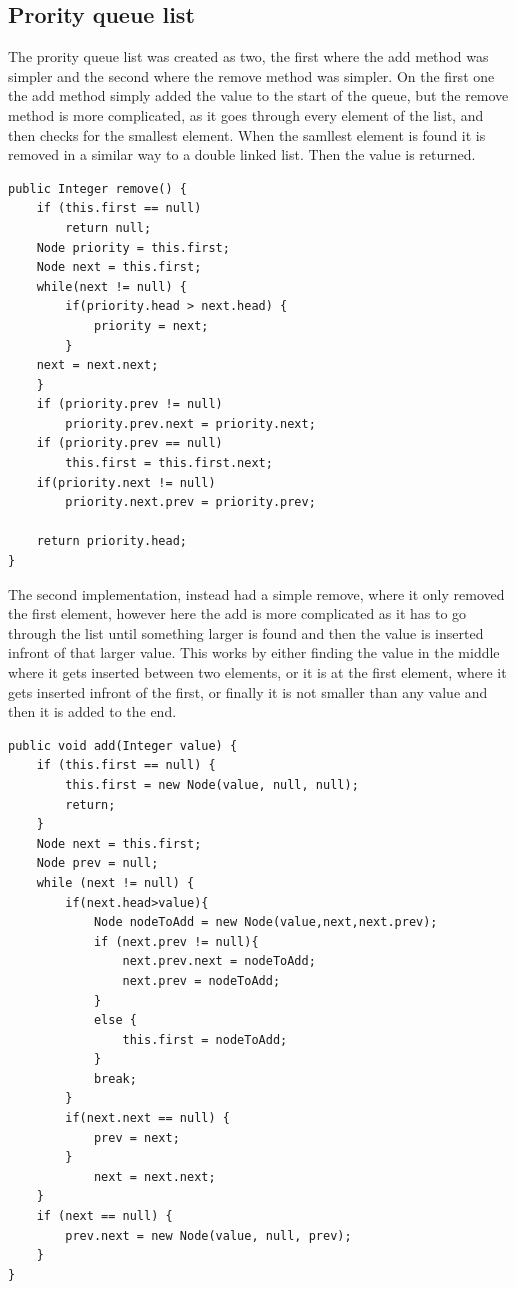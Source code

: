 \documentclass[a4paper,11pt]{article}
\begin{document}
\subsection*{Prority queue list}
The prority queue list was created as two, the first where the add method was simpler and the second where the remove method was simpler. On the first one the add method simply added
the value to the start of the queue, but the remove method is more complicated, as it goes through every element of the list, and then checks for the smallest element. When the samllest element is found it is removed in a similar way to a double linked list. Then the value is returned.
\begin{verbatim}
public Integer remove() {
    if (this.first == null)
        return null;
    Node priority = this.first;
    Node next = this.first;
    while(next != null) {
        if(priority.head > next.head) {
            priority = next;
        }
    next = next.next;
    }
    if (priority.prev != null)
        priority.prev.next = priority.next;
    if (priority.prev == null)
        this.first = this.first.next;
    if(priority.next != null)
        priority.next.prev = priority.prev;

    return priority.head;
}    
\end{verbatim}
The second implementation, instead had a simple remove, where it only removed the first element, however here the add is more complicated as it has to go through the list until something larger is found and then the value is inserted infront of that larger value. 
This works by either finding the value in the middle where it gets inserted between two elements, or it is at the first element, where it gets inserted infront of the first, or finally it is not smaller than any value and then it is added to the end.
\begin{verbatim}
public void add(Integer value) {
    if (this.first == null) {
        this.first = new Node(value, null, null);
        return;
    }
    Node next = this.first;
    Node prev = null;
    while (next != null) {
        if(next.head>value){
            Node nodeToAdd = new Node(value,next,next.prev);
            if (next.prev != null){
                next.prev.next = nodeToAdd;
                next.prev = nodeToAdd;
            }
            else {
                this.first = nodeToAdd;
            }
            break;
        }
        if(next.next == null) {
            prev = next;
        }
            next = next.next;
    }
    if (next == null) {
        prev.next = new Node(value, null, prev);
    }
}
\end{verbatim}
\end{document}
